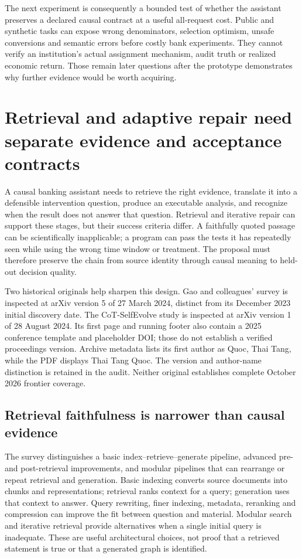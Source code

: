 The next experiment is consequently a bounded test of whether the assistant
preserves a declared causal contract at a useful all-request cost. Public and
synthetic tasks can expose wrong denominators, selection optimism, unsafe
conversions and semantic errors before costly bank experiments. They cannot
verify an institution's actual assignment mechanism, audit truth or realized
economic return. Those remain later questions after the prototype demonstrates
why further evidence would be worth acquiring.


\section{Retrieval and adaptive repair need separate evidence and acceptance contracts}
\label{exec19:ragrepair-scope}
A causal banking assistant needs to retrieve the right evidence, translate it
into a defensible intervention question, produce an executable analysis, and
recognize when the result does not answer that question. Retrieval and iterative
repair can support these stages, but their success criteria differ. A faithfully
quoted passage can be scientifically inapplicable; a program can pass the tests
it has repeatedly seen while using the wrong time window or treatment. The
proposal must therefore preserve the chain from source identity through causal
meaning to held-out decision quality.

Two historical originals help sharpen this design. Gao and colleagues' survey
is inspected at arXiv version 5 of 27 March 2024, distinct from its December 2023
initial discovery date. The CoT-SelfEvolve study is inspected at arXiv version 1
of 28 August 2024. Its first page and running footer also contain a 2025 conference
template and placeholder DOI; those do not establish a verified proceedings
version. Archive metadata lists its first author as Quoc, Thai Tang, while the
PDF displays Thai Tang Quoc. The version and author-name distinction is retained
in the audit. Neither original establishes complete October 2026 frontier coverage.
\citep{exec19_rag_survey,exec19_selfcorrection_study}

\subsection{Retrieval faithfulness is narrower than causal evidence}
\label{exec19:ragrepair-retrieval}
The survey distinguishes a basic index--retrieve--generate pipeline, advanced
pre- and post-retrieval improvements, and modular pipelines that can rearrange
or repeat retrieval and generation. Basic indexing converts source documents
into chunks and representations; retrieval ranks context for a query; generation
uses that context to answer. Query rewriting, finer indexing, metadata, reranking
and compression can improve the fit between question and material. Modular
search and iterative retrieval provide alternatives when a single initial
query is inadequate. These are useful architectural choices, not proof that a
retrieved statement is true or that a generated graph is identified.
\citep{exec19_rag_survey}

